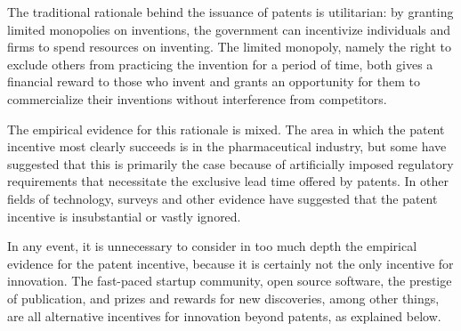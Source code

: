 \documentclass[11pt,twocolumn,titlepage]{article}
\begin{document}
The traditional rationale behind the issuance of patents is utilitarian: by
granting limited monopolies on inventions, the government can incentivize
individuals and firms to spend resources on inventing. The limited monopoly,
namely the right to exclude others from practicing the invention for a period
of time, both gives a financial reward to those who invent and grants an
opportunity for them to commercialize their inventions without interference
from competitors.

The empirical evidence for this rationale is mixed. The area in which the
patent incentive most clearly succeeds is in the pharmaceutical
industry,
but some have suggested that this is primarily the case because of artificially
imposed
regulatory requirements that necessitate the exclusive lead time offered by
patents.
In other fields of technology, surveys and other evidence have
suggested that the patent incentive is insubstantial or vastly
ignored.

In any event, it is unnecessary to consider in too much depth the empirical
evidence for the patent incentive, because it is certainly not the only
incentive for innovation. The fast-paced startup community, open source
software, the prestige of publication, and prizes and rewards for new
discoveries, among other things,
are all alternative
incentives for innovation beyond patents, as explained below.
\end{document}
